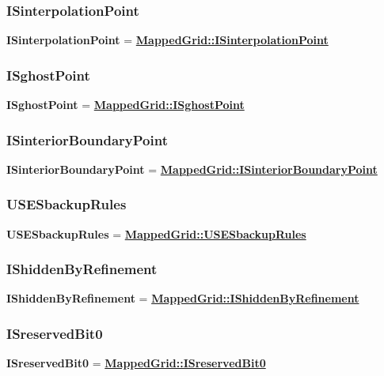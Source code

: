 \documentclass{article}
\begin{document}
  \subsubsection{ISinterpolationPoint}
  \label{GridCollection::ISinterpolationPoint}
    \textbf{ISinterpolationPoint} =
    {\bf{}\hyperref{MappedGrid::ISinterpolationPoint}{MappedGrid::ISinterpolationPoint \rm(\S}{)}{MappedGrid::ISinterpolationPoint}}

  \subsubsection{ISghostPoint}
  \label{GridCollection::ISghostPoint}
    \textbf{ISghostPoint} =
    {\bf{}\hyperref{MappedGrid::ISghostPoint}{MappedGrid::ISghostPoint \rm(\S}{)}{MappedGrid::ISghostPoint}}

  \subsubsection{ISinteriorBoundaryPoint}
  \label{GridCollection::ISinteriorBoundaryPoint}
    \textbf{ISinteriorBoundaryPoint} =
    {\bf{}\hyperref{MappedGrid::ISinteriorBoundaryPoint}{MappedGrid::ISinteriorBoundaryPoint \rm(\S}{)}{MappedGrid::ISinteriorBoundaryPoint}}

  \subsubsection{USESbackupRules}
  \label{GridCollection::USESbackupRules}
    \textbf{USESbackupRules} =
    {\bf{}\hyperref{MappedGrid::USESbackupRules}{MappedGrid::USESbackupRules \rm(\S}{)}{MappedGrid::USESbackupRules}}

  \subsubsection{IShiddenByRefinement}
  \label{GridCollection::IShiddenByRefinement}
    \textbf{IShiddenByRefinement} =
    {\bf{}\hyperref{MappedGrid::IShiddenByRefinement}{MappedGrid::IShiddenByRefinement \rm(\S}{)}{MappedGrid::IShiddenByRefinement}}

  \subsubsection{ISreservedBit0}
  \label{GridCollection::ISreservedBit0}
    \textbf{ISreservedBit0} =
    {\bf{}\hyperref{MappedGrid::ISreservedBit0}{MappedGrid::ISreservedBit0 \rm(\S}{)}{MappedGrid::ISreservedBit0}}
\end{document}

